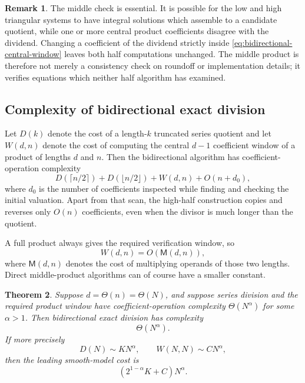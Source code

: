 \documentclass[11pt]{book}
\newtheorem{theorem}{Theorem}[section]
\theoremstyle{definition}
\newtheorem{remark}[theorem]{Remark}
\begin{document}
\begin{remark}
The middle check is essential.  It is possible for the low and high triangular
systems to have integral solutions which assemble to a candidate quotient,
while one or more central product coefficients disagree with the dividend.
Changing a coefficient of the dividend strictly inside
\eqref{eq:bidirectional-central-window} leaves both half computations
unchanged.  The middle product is therefore not merely a consistency check on
roundoff or implementation details; it verifies equations which neither half
algorithm has examined.
\end{remark}

\subsection{Complexity of bidirectional exact division}

Let $D(k)$ denote the cost of a length-$k$ truncated series quotient and let
$W(d,n)$ denote the cost of computing the central $d-1$ coefficient window of
a product of lengths $d$ and $n$.  Then the bidirectional algorithm has
coefficient-operation complexity
\begin{equation}\label{eq:bidirectional-complexity}
 D(\lceil n/2\rceil)
 +D(\lfloor n/2\rfloor)
 +W(d,n)
 +O(n+d_0),
\end{equation}
where $d_0$ is the number of coefficients inspected while finding and checking
the initial valuation.  Apart from that scan, the high-half construction
copies and reverses only $O(n)$ coefficients, even when the divisor is much
longer than the quotient.

A full product always gives the required verification window, so
\[
 W(d,n)=O(\mathsf M(d,n)),
\]
where $\mathsf M(d,n)$ denotes the cost of multiplying operands of those two
lengths.  Direct middle-product algorithms can of course have a smaller
constant.

\begin{theorem}\label{thm:bidirectional-balanced-complexity}
Suppose $d=\Theta(n)=\Theta(N)$, and suppose series division and the required
product window have coefficient-operation complexity $\Theta(N^\alpha)$ for
some $\alpha>1$.  Then bidirectional exact division has complexity
\[
 \Theta(N^\alpha).
\]
If more precisely
\[
 D(N)\sim K N^\alpha,
 \qquad
 W(N,N)\sim C N^\alpha,
\]
then the leading smooth-model cost is
\begin{equation}\label{eq:bidirectional-leading-constant}
 \left(2^{1-\alpha}K+C\right)N^\alpha.
\end{equation}
\end{theorem}
\end{document}
